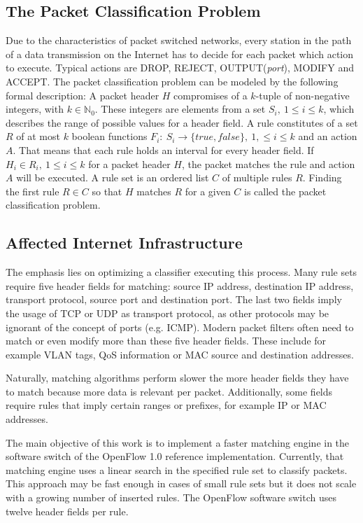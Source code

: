 \documentclass[conference]{IEEEtran}
\begin{document}
\subsection{The Packet Classification Problem}
Due to the characteristics of packet switched networks, every station in the path of a data transmission on the Internet 
has to decide for each packet which action to execute.
Typical actions are DROP, REJECT, OUTPUT(\textit{port}), MODIFY and ACCEPT.
The packet classification problem can be modeled by the following formal description:
A packet header $H$ compromises of a $k$-tuple of non-negative integers, with $k \in \mathds{N}_0$.
These integers are elements from a set $S_i,\ 1 \leq i \leq k$, which describes the range of possible values for a header field.
A rule constitutes of a set $R$ of at most $k$ boolean functions
$F_i:\ S_i \rightarrow \{true, false\},\ 1,\leq i \leq k$ and an action $A$.
That means that each rule holds an interval for every header field.
If $H_i \in R_i,\ 1 \leq i \leq k$ for a packet header $H$, the packet matches the rule and action $A$ will be executed.
A rule set is an ordered list $C$ of multiple rules $R$.
Finding the first rule $R \in C$ so that $H$ matches 
$R$ for a given $C$ is called the packet classification problem.

\subsection{Affected Internet Infrastructure}
The emphasis lies on optimizing a classifier executing this process.
Many rule sets require five header fields for matching: source 
IP address, destination IP address, transport protocol, source port and destination port.
The last two fields imply the usage of TCP or UDP as transport protocol, 
as other protocols may be ignorant of the concept of ports (e.g. ICMP).
Modern packet filters often need to match or even modify more than these five header fields.
These include for example VLAN tags, QoS information or MAC source and destination addresses.

Naturally, matching algorithms perform slower the more header fields they 
have to match because more data is relevant per packet.
Additionally, some fields require rules that imply certain ranges or prefixes, for example IP or MAC addresses.

The main objective of this work is to implement a faster matching engine in the 
software switch of the OpenFlow 1.0 reference implementation.
Currently, that matching engine uses a linear search in the specified rule set to classify packets.
This approach may be fast enough in cases of small rule sets but it does not scale
with a growing number of inserted rules.
The OpenFlow software switch uses twelve header fields per rule.
\end{document}
